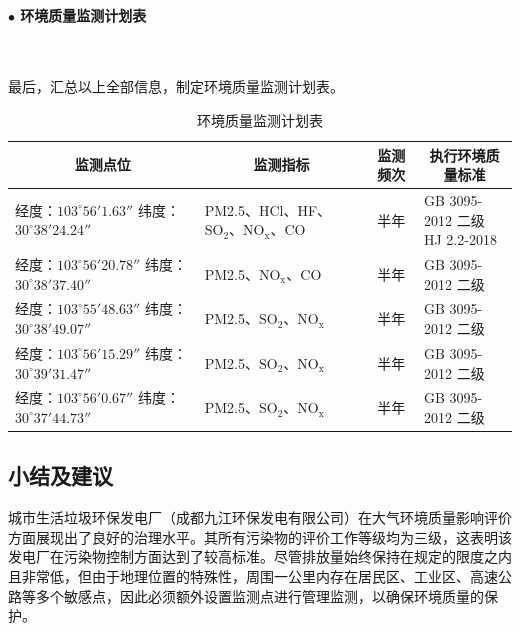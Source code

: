 \paragraph{$\bullet$ 环境质量监测计划表}~{}\par
最后，汇总以上全部信息，制定环境质量监测计划表。

\begin{table}[H]
    \centering
    \caption{环境质量监测计划表}
    \begin{tabular}{|l|l|c|l|}
    \hline
    \multicolumn{1}{|c|}{监测点位}  & \multicolumn{1}{c|}{监测指标}  & \multicolumn{1}{c|}{监测频次}  & \multicolumn{1}{c|}{执行环境质量标准} \\
    \hline
    \makecell[l]{经度：$103^{\circ}56'1.63''$\\纬度：$30^{\circ}38'24.24''$}  & \makecell[l]{PM2.5、HCl、HF、\\ $\mathrm{SO_2}$、$\mathrm{NO_x}$、CO} & 半年    & \makecell[l]{GB 3095-2012 二级\\HJ 2.2-2018} \\
    \hline
    \makecell[l]{经度：$103^{\circ}56'20.78''$\\纬度：$30^{\circ}38'37.40''$} & PM2.5、$\mathrm{NO_x}$、CO & 半年    & GB 3095-2012 二级 \\
    \hline
    \makecell[l]{经度：$103^{\circ}55'48.63''$\\纬度：$30^{\circ}38'49.07''$} & PM2.5、$\mathrm{SO_2}$、$\mathrm{NO_x}$ & 半年    & GB 3095-2012 二级 \\
    \hline
    \makecell[l]{经度：$103^{\circ}56'15.29''$\\纬度：$30^{\circ}39'31.47''$} & PM2.5、$\mathrm{SO_2}$、$\mathrm{NO_x}$ & 半年    & GB 3095-2012 二级 \\
    \hline
    \makecell[l]{经度：$103^{\circ}56'0.67''$\\纬度：$30^{\circ}37'44.73''$} & PM2.5、$\mathrm{SO_2}$、$\mathrm{NO_x}$ & 半年    & GB 3095-2012 二级 \\
    \hline
    \end{tabular}%
    \label{tab:Environmental quality monitoring schedule}%
\end{table}%


\subsection{小结及建议}

城市生活垃圾环保发电厂（成都九江环保发电有限公司）在大气环境质量影响评价方面展现出了良好的治理水平。其所有污染物的评价工作等级均为三级，这表明该发电厂在污染物控制方面达到了较高标准。尽管排放量始终保持在规定的限度之内且非常低，但由于地理位置的特殊性，周围一公里内存在居民区、工业区、高速公路等多个敏感点，因此必须额外设置监测点进行管理监测，以确保环境质量的保护。

